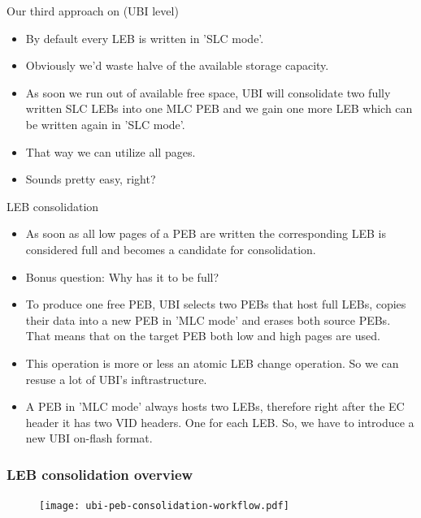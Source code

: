 \documentclass[aspectratio=169,obeyspaces,spaces,hyphens,dvipsnames]{beamer}
\begin{document}
\begin{frame}{Our third approach on (UBI level)}
  \begin{itemize}
  \item By default every LEB is written in 'SLC mode'.
  \item Obviously we'd waste halve of the available storage capacity.
  \item As soon we run out of available free space, UBI will consolidate two fully written SLC LEBs
        into one MLC PEB and we gain one more LEB which can be written again in 'SLC mode'.
  \item That way we can utilize all pages.
  \item Sounds pretty easy, right?
  \end{itemize}
\end{frame}

\begin{frame}{LEB consolidation}
  \begin{itemize}
  \item As soon as all low pages of a PEB are written the corresponding LEB is considered full
        and becomes a candidate for consolidation.
  \item Bonus question: Why has it to be full?
  \item To produce one free PEB, UBI selects two PEBs that host full LEBs, copies their data
        into a new PEB in 'MLC mode' and erases both source PEBs.
        That means that on the target PEB both low and high pages
        are used.
  \item This operation is more or less an atomic LEB change operation. So we can resuse a lot of
        UBI's inftrastructure.
  \item A PEB in 'MLC mode' always hosts two LEBs, therefore right after the EC header it has
        two VID headers. One for each LEB. So, we have to introduce a new UBI on-flash format.
  \end{itemize}
\end{frame}

\begin{frame}[fragile]
\frametitle{LEB consolidation overview}
     \begin{figure}
     \texttt{[image: ubi-peb-consolidation-workflow.pdf]}
     \end{figure}
\end{frame}
\end{document}
